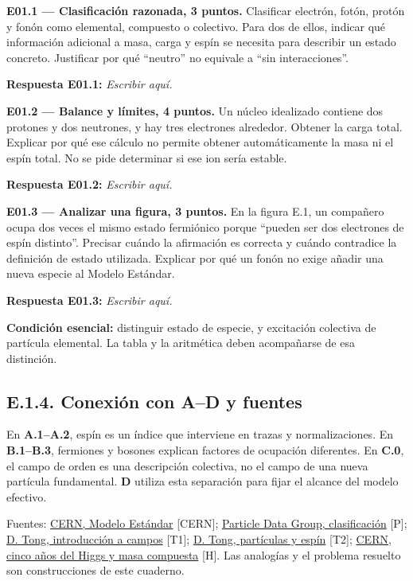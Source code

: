 \documentclass[
  spanish,
  10pt,
  a4paper,
]{article}
\begin{document}
\textbf{E01.1 --- Clasificación razonada, 3 puntos.} Clasificar
electrón, fotón, protón y fonón como elemental, compuesto o colectivo.
Para dos de ellos, indicar qué información adicional a masa, carga y
espín se necesita para describir un estado concreto. Justificar por qué
``neutro'' no equivale a ``sin interacciones''.

\textbf{Respuesta E01.1:} \emph{Escribir aquí.}

\textbf{E01.2 --- Balance y límites, 4 puntos.} Un núcleo idealizado
contiene dos protones y dos neutrones, y hay tres electrones alrededor.
Obtener la carga total. Explicar por qué ese cálculo no permite obtener
automáticamente la masa ni el espín total. No se pide determinar si ese
ion sería estable.

\textbf{Respuesta E01.2:} \emph{Escribir aquí.}

\textbf{E01.3 --- Analizar una figura, 3 puntos.} En la figura E.1, un
compañero ocupa dos veces el mismo estado fermiónico porque ``pueden ser
dos electrones de espín distinto''. Precisar cuándo la afirmación es
correcta y cuándo contradice la definición de estado utilizada. Explicar
por qué un fonón no exige añadir una nueva especie al Modelo Estándar.

\textbf{Respuesta E01.3:} \emph{Escribir aquí.}

\textbf{Condición esencial:} distinguir estado de especie, y excitación
colectiva de partícula elemental. La tabla y la aritmética deben
acompañarse de esa distinción.

\subsection{E.1.4. Conexión con A--D y
fuentes}\label{e.1.4.-conexiuxf3n-con-ad-y-fuentes}

En \textbf{A.1--A.2}, espín es un índice que interviene en trazas y
normalizaciones. En \textbf{B.1--B.3}, fermiones y bosones explican
factores de ocupación diferentes. En \textbf{C.0}, el campo de orden es
una descripción colectiva, no el campo de una nueva partícula
fundamental. \textbf{D} utiliza esta separación para fijar el alcance
del modelo efectivo.

Fuentes: \href{https://home.cern/science/physics/standard-model/}{CERN,
Modelo Estándar} {[}CERN{]};
\href{https://pdg.lbl.gov/chris/museum_version/standard_model.html}{Particle
Data Group, clasificación} {[}P{]};
\href{https://www.damtp.cam.ac.uk/user/tong/qft/qfthtml/S0.html}{D.
Tong, introducción a campos} {[}T1{]};
\href{https://www.damtp.cam.ac.uk/user/tong/pp/pp2.pdf}{D. Tong,
partículas y espín} {[}T2{]};
\href{https://home.cern/sites/default/files/file/scientists/CCJulAug17_HIGSAT5.pdf}{CERN,
cinco años del Higgs y masa compuesta} {[}H{]}. Las analogías y el
problema resuelto son construcciones de este cuaderno.
\end{document}
